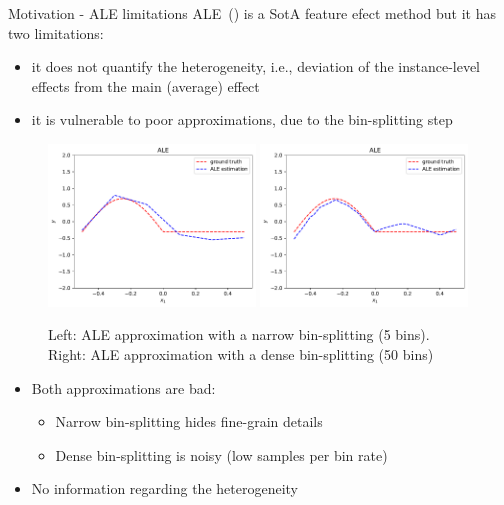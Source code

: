 \documentclass[final]{beamer}
\newlength{\colwidth}
\begin{document}
\begin{frame}[t]
\begin{columns}[t]
\begin{column}{\colwidth}
			\begin{block}{Motivation - ALE limitations}{}
        ALE~(\cite{Apley2020}) is a SotA feature efect method but it has two limitations:
        \begin{itemize}
        \item it does not quantify the heterogeneity, i.e., deviation of the instance-level effects from the main (average) effect
          \item it is vulnerable to poor approximations, due to the bin-splitting step
        \end{itemize}
        \begin{figure}
          \centering
          \includegraphics[width=0.49\textwidth]{./../code/concept_figure/exp_1_ale_5_bins_0.pdf}
          \includegraphics[width=0.49\textwidth]{./../code/concept_figure/exp_1_ale_50_bins_0.pdf}
          \caption{Left: ALE approximation with a narrow bin-splitting (5 bins). Right: ALE approximation with a dense bin-splitting (50 bins)}
          \label{fig:acc-1}
        \end{figure}
        \begin{itemize}
        \item Both approximations are bad:
          \begin{itemize}
          \item Narrow bin-splitting hides fine-grain details
            \item Dense bin-splitting is noisy (low samples per bin rate)
          \end{itemize}
          \item No information regarding the heterogeneity
        \end{itemize}
			\end{block}



\end{column}
\end{columns}
\end{frame}
\end{document}
